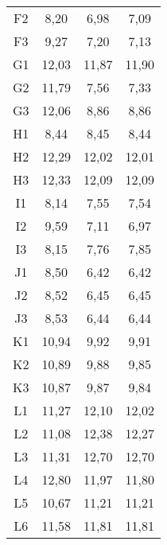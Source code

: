 \begin{center}
\begin{longtable}{cccc}
    F2    & 8,20  & 6,98  & 7,09 \\
    F3    & 9,27  & 7,20  & 7,13 \\
    G1    & 12,03 & 11,87 & 11,90 \\
    G2    & 11,79 & 7,56  & 7,33 \\
    G3    & 12,06 & 8,86  & 8,86 \\
    H1    & 8,44  & 8,45  & 8,44 \\
    H2    & 12,29 & 12,02 & 12,01 \\
    H3    & 12,33 & 12,09 & 12,09 \\
    I1    & 8,14  & 7,55  & 7,54 \\
    I2    & 9,59  & 7,11  & 6,97 \\
    I3    & 8,15  & 7,76  & 7,85 \\
    J1    & 8,50  & 6,42  & 6,42 \\
    J2    & 8,52  & 6,45  & 6,45 \\
    J3    & 8,53  & 6,44  & 6,44 \\
    K1    & 10,94 & 9,92  & 9,91 \\
    K2    & 10,89 & 9,88  & 9,85 \\
    K3    & 10,87 & 9,87  & 9,84 \\
    L1    & 11,27 & 12,10 & 12,02 \\
    L2    & 11,08 & 12,38 & 12,27 \\
    L3    & 11,31 & 12,70 & 12,70 \\
    L4    & 12,80 & 11,97 & 11,80 \\
    L5    & 10,67 & 11,21 & 11,21 \\
    L6    & 11,58 & 11,81 & 11,81 \\

\end{longtable}
\end{center}

